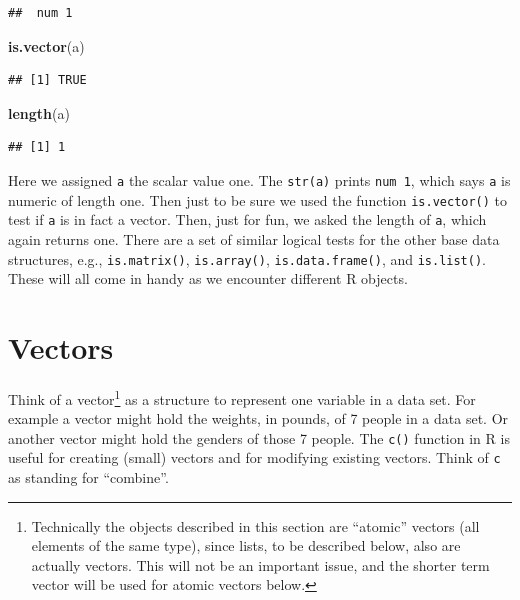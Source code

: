 \documentclass[
]{krantz}
\newenvironment{Shaded}{\begin{snugshade}}{\end{snugshade}}
\newcommand{\KeywordTok}[1]{\textcolor[rgb]{0.13,0.29,0.53}{\textbf{#1}}}
\newcommand{\NormalTok}[1]{#1}
\begin{document}
\begin{verbatim}
##  num 1
\end{verbatim}

\begin{Shaded}
\begin{Highlighting}[]
\KeywordTok{is.vector}\NormalTok{(a)}
\end{Highlighting}
\end{Shaded}

\begin{verbatim}
## [1] TRUE
\end{verbatim}

\begin{Shaded}
\begin{Highlighting}[]
\KeywordTok{length}\NormalTok{(a)}
\end{Highlighting}
\end{Shaded}

\begin{verbatim}
## [1] 1
\end{verbatim}

Here we assigned \texttt{a} the scalar value one. The \texttt{str(a)} prints \texttt{num\ 1}, which says \texttt{a} is numeric of length one. Then just to be sure we used the function \texttt{is.vector()} to test if \texttt{a} is in fact a vector. Then, just for fun, we asked the length of \texttt{a}, which again returns one. There are a set of similar logical tests for the other base data structures, e.g., \texttt{is.matrix()}, \texttt{is.array()}, \texttt{is.data.frame()}, and \texttt{is.list()}. These will all come in handy as we encounter different R objects.

\hypertarget{vector}{%
\section{Vectors}\label{vector}}

Think of a vector\footnote{Technically the objects described in this section are ``atomic'' vectors (all elements of the same type), since lists, to be described below, also are actually vectors. This will not be an important issue, and the shorter term vector will be used for atomic vectors below.} as a structure to represent one variable in a data set. For example a vector might hold the weights, in pounds, of 7 people in a data set. Or another vector might hold the genders of those 7 people. The \texttt{c()} function in R is useful for creating (small) vectors and for modifying existing vectors. Think of \texttt{c} as standing for ``combine''.
\end{document}
